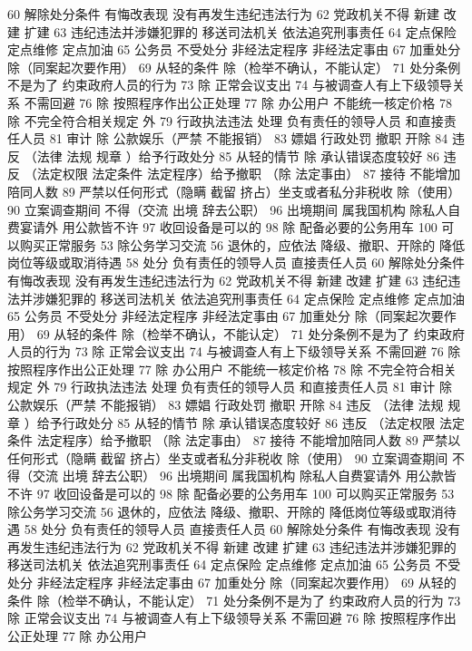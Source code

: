 \documentclass[11pt]{ctexart}
\begin{document}
60 解除处分条件
有悔改表现
没有再发生违纪违法行为
62 党政机关不得
新建 改建 扩建
63 违纪违法并涉嫌犯罪的
移送司法机关
依法追究刑事责任
64 定点保险 定点维修 定点加油
65 公务员 不受处分
非经法定程序
非经法定事由
67 加重处分
除（同案起次要作用）
69 从轻的条件
除（检举不确认，不能认定）
71 处分条例不是为了
约束政府人员的行为
73 除 正常会议支出
74 与被调查人有上下级领导关系 不需回避
76 除 按照程序作出公正处理
77 除 办公用户
不能统一核定价格
78 除 不完全符合相关规定 外
79 行政执法违法 处理
负有责任的领导人员
和直接责任人员
81 审计
除 公款娱乐（严禁 不能报销）
83 嫖娼 行政处罚
撤职 开除
84 违反 （法律 法规 规章 ）给予行政处分
85 从轻的情节
除 承认错误态度较好
86 违反 （法定权限 法定条件 法定程序）给予撤职
（除 法定事由）
87 接待 不能增加陪同人数
89 严禁以任何形式（隐瞒 截留 挤占）坐支或者私分非税收
除（使用）
90 立案调查期间 不得（交流 出境 辞去公职）
96 出境期间 属我国机构 除私人自费宴请外 用公款皆不许
97 收回设备是可以的
98 除 配备必要的公务用车
100 可以购买正常服务
53 除公务学习交流
56 退休的，应依法
降级、撤职、开除的 降低岗位等级或取消待遇
58 处分
负有责任的领导人员
直接责任人员
60 解除处分条件
有悔改表现
没有再发生违纪违法行为
62 党政机关不得
新建 改建 扩建
63 违纪违法并涉嫌犯罪的
移送司法机关
依法追究刑事责任
64 定点保险 定点维修 定点加油
65 公务员 不受处分
非经法定程序
非经法定事由
67 加重处分
除（同案起次要作用）
69 从轻的条件
除（检举不确认，不能认定）
71 处分条例不是为了
约束政府人员的行为
73 除 正常会议支出
74 与被调查人有上下级领导关系 不需回避
76 除 按照程序作出公正处理
77 除 办公用户
不能统一核定价格
78 除 不完全符合相关规定 外
79 行政执法违法 处理
负有责任的领导人员
和直接责任人员
81 审计
除 公款娱乐（严禁 不能报销）
83 嫖娼 行政处罚
撤职 开除
84 违反 （法律 法规 规章 ）给予行政处分
85 从轻的情节
除 承认错误态度较好
86 违反 （法定权限 法定条件 法定程序）给予撤职
（除 法定事由）
87 接待 不能增加陪同人数
89 严禁以任何形式（隐瞒 截留 挤占）坐支或者私分非税收
除（使用）
90 立案调查期间 不得（交流 出境 辞去公职）
96 出境期间 属我国机构 除私人自费宴请外 用公款皆不许
97 收回设备是可以的
98 除 配备必要的公务用车
100 可以购买正常服务
53 除公务学习交流
56 退休的，应依法
降级、撤职、开除的 降低岗位等级或取消待遇
58 处分
负有责任的领导人员
直接责任人员
60 解除处分条件
有悔改表现
没有再发生违纪违法行为
62 党政机关不得
新建 改建 扩建
63 违纪违法并涉嫌犯罪的
移送司法机关
依法追究刑事责任
64 定点保险 定点维修 定点加油
65 公务员 不受处分
非经法定程序
非经法定事由
67 加重处分
除（同案起次要作用）
69 从轻的条件
除（检举不确认，不能认定）
71 处分条例不是为了
约束政府人员的行为
73 除 正常会议支出
74 与被调查人有上下级领导关系 不需回避
76 除 按照程序作出公正处理
77 除 办公用户
\end{document}
